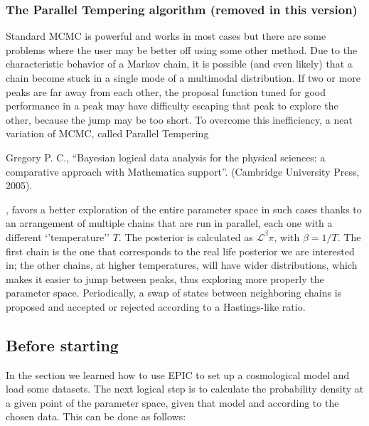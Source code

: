 \documentclass[letterpaper,12pt,english]{sphinxhowto}
\begin{document}
\subsubsection{The Parallel Tempering algorithm (removed in this version)}
\label{\detokenize{intro:pt-algo}}\label{\detokenize{intro:the-parallel-tempering-algorithm-removed-in-this-version}}
Standard MCMC is powerful and works in most cases but there are some problems
where the user may be better off using some other method.
Due to the characteristic behavior of a Markov chain, it is possible (and even
likely) that a chain become stuck in a single mode of a multimodal
distribution.
If two or more peaks are far away from each other, the proposal function tuned
for good performance in a peak may have difficulty escaping that peak to
explore the other, because the jump may be too short.
To overcome this inefficiency, a neat variation of MCMC, called Parallel
Tempering %
\begin{footnote}[4]\sphinxAtStartFootnote
Gregory P. C., “Bayesian logical data analysis for the physical sciences: a comparative approach with Mathematica support”. (Cambridge University Press, 2005).
%
\end{footnote}, favors a better exploration of the entire parameter
space in such cases thanks to an arrangement of multiple chains that are run in
parallel, each one with a different ‘’temperature’’ \(T\).
The posterior is calculated as \(\mathcal{L}^{\beta} \pi\), with
\(\beta = 1/T\).
The first chain is the one that corresponds to the real life posterior we are
interested in; the other chains, at higher temperatures, will have wider
distributions, which makes it easier to jump between peaks, thus exploring more
properly the parameter space.
Periodically, a swap of states between neighboring chains is proposed and
accepted or rejected according to a Hastings-like ratio.


\subsection{Before starting}
\label{\detokenize{beforestart::doc}}\label{\detokenize{beforestart:before-starting}}
In the section {\hyperref[\detokenize{cosmology:cosmology-module}]{}} we learned how to use EPIC to set up a
cosmological model and load some datasets.
The next logical step is to calculate the probability density at a given point
of the parameter space, given that model and according to the chosen data.
This can be done as follows:
\end{document}

